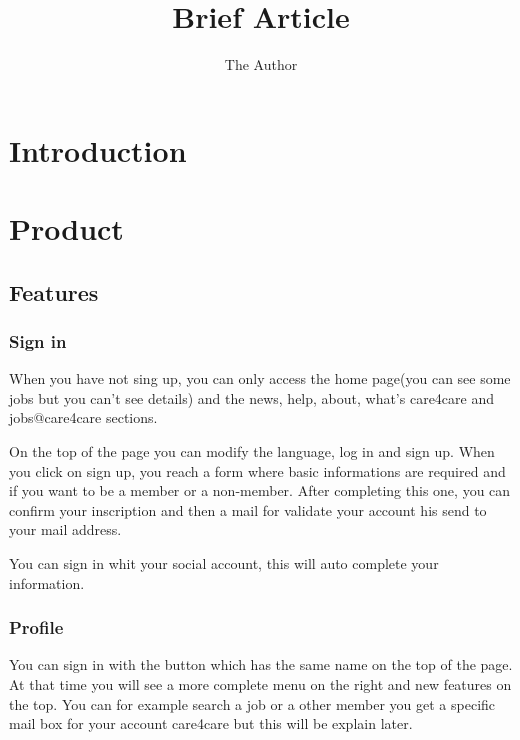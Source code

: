 \documentclass[11pt, a4paper]{article}   	%
\title{Brief Article}
\author{The Author}
\begin{document}

\section{Introduction}

\section{Product}

\subsection{Features}

\subsubsection{Sign in}

When you have not sing up, you can only access the home page(you can see some jobs but you can't see details) and the news, help, about, what's care4care and jobs@care4care sections.
\newline

On the top of the page you can modify the language, log in and sign up. When you click on sign up, you reach a form where basic informations are required and if you want to be a member or a non-member. After completing this one, you can confirm your inscription and then a mail for validate your account his send to your mail address.
\newline

You can sign in whit your social account, this will auto complete your information.

\subsubsection{Profile}

You can sign in with the button which has the same name on the top of the page. At that time you will see a more complete menu on the right and new features on the top. You can for example search a job or a other member you get a specific mail box for your account care4care but this will be explain later.
\newline
\end{document}

